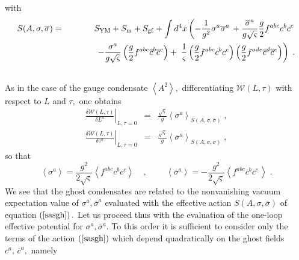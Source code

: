 \documentclass[a4paper,12pt]{article}
\begin{document}
with
\begin{eqnarray}
S(A,\sigma ,\overline{\sigma }) &=&S_{\mathrm{YM}}+S_{\mathrm{m}}+S_{\mathrm{%
gf}}+\int d^{4}x\left( -\frac{1}{g^{2}}\sigma ^{a}\overline{\sigma }^{a}\,+%
\frac{\overline{\sigma }^{a}}{g\sqrt{\varsigma }}\frac{g}{2}%
f^{abc}c^{b}c^{c}\right.   \nonumber \\
&&\,\,\,\,\,\,\,\,\,\,\,\,\,\,\left. \;\;\;-\frac{\sigma ^{a}}{g\sqrt{%
\varsigma }}\left( \frac{g}{2}f^{abc}\overline{c}^{b}\overline{c}^{c}\right)
+\;\frac{1}{\varsigma }\left( \frac{g}{2}f^{abc}c^{b}c^{c}\right) \left( 
\frac{g}{2}f^{ade}\overline{c}^{d}\overline{c}^{e}\right) \right) \;. 
\nonumber \\
&&  \label{sasgh}
\end{eqnarray}
As in the case of the gauge condensate $\left\langle A^{2}\right\rangle ,$
differentiating $\mathcal{W}(L,\tau )$ with respect to $L$ and $\tau ,$ one
obtains
\begin{eqnarray}
\left. \frac{\delta \mathcal{W}(L,\tau )}{\delta L^{a}}\right| _{L,\tau =0}
&=&\frac{\sqrt{\varsigma }}{g}\left\langle \sigma ^{a}\right\rangle
_{S(A,\sigma ,\overline{\sigma })}\;,  \label{dlts} \\
\left. \frac{\delta \mathcal{W}(L,\tau )}{\delta \tau ^{a}}\right| _{L,\tau
=0} &=&\frac{\sqrt{\varsigma }}{g}\left\langle \overline{\sigma }%
^{a}\right\rangle _{S(A,\sigma ,\overline{\sigma })}\;,  \nonumber
\end{eqnarray}
so that 
\begin{equation}
\left\langle \sigma ^{a}\right\rangle =\frac{g^{2}}{2\sqrt{\varsigma }}%
\left\langle f^{abc}c^{b}c^{c}\right\rangle
\;\;\;\;,\;\;\;\;\;\;\;\;\left\langle \overline{\sigma }^{a}\right\rangle =-%
\frac{g^{2}}{2\sqrt{\varsigma }}\left\langle f^{abc}\overline{c}^{b}%
\overline{c}^{c}\,\right\rangle \;.  \label{ssb}
\end{equation}
We see that the ghost condensates are related to the nonvanishing vacuum
expectation value of $\sigma ^{a},\overline{\sigma }^{a}$ evaluated with the
effective action $S(A,\sigma ,\overline{\sigma })$ of equation $\left( \ref
{sasgh}\right) .$ Let us proceed thus with the evaluation of the one-loop
effective potential for $\sigma ^{a},\overline{\sigma }^{a}$. To this order
it is sufficient to consider only the terms of the action $\left( \ref{sasgh}%
\right) $ which depend quadratically on the ghost fields $c^{a},\,\overline{c%
}^{a},$ namely
\end{document}
